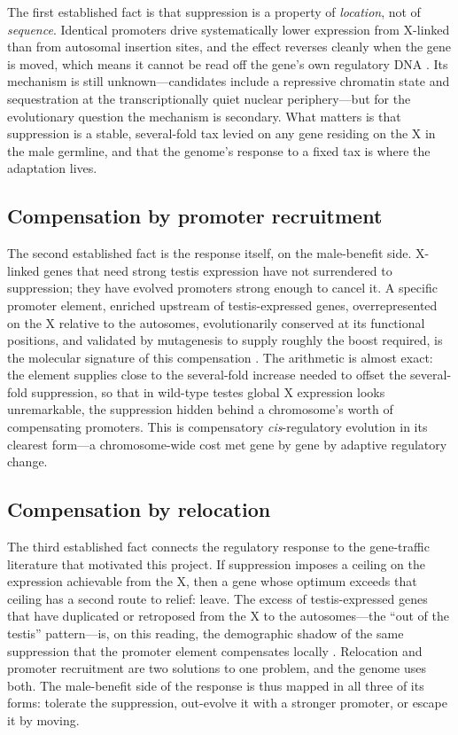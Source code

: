 \documentclass[11pt,a4paper]{article}
\begin{document}
The first established fact is that suppression is a property of \emph{location}, not of \emph{sequence}. Identical promoters drive systematically lower expression from X-linked than from autosomal insertion sites, and the effect reverses cleanly when the gene is moved, which means it cannot be read off the gene's own regulatory DNA \citep{landeen2016}. Its mechanism is still unknown---candidates include a repressive chromatin state and sequestration at the transcriptionally quiet nuclear periphery---but for the evolutionary question the mechanism is secondary. What matters is that suppression is a stable, several-fold tax levied on any gene residing on the X in the male germline, and that the genome's response to a fixed tax is where the adaptation lives.

\subsection{Compensation by promoter recruitment}

The second established fact is the response itself, on the male-benefit side. X-linked genes that need strong testis expression have not surrendered to suppression; they have evolved promoters strong enough to cancel it. A specific promoter element, enriched upstream of testis-expressed genes, overrepresented on the X relative to the autosomes, evolutionarily conserved at its functional positions, and validated by mutagenesis to supply roughly the boost required, is the molecular signature of this compensation \citep{landeen2016}. The arithmetic is almost exact: the element supplies close to the several-fold increase needed to offset the several-fold suppression, so that in wild-type testes global X expression looks unremarkable, the suppression hidden behind a chromosome's worth of compensating promoters. This is compensatory \emph{cis}-regulatory evolution in its clearest form---a chromosome-wide cost met gene by gene by adaptive regulatory change.

\subsection{Compensation by relocation}

The third established fact connects the regulatory response to the gene-traffic literature that motivated this project. If suppression imposes a ceiling on the expression achievable from the X, then a gene whose optimum exceeds that ceiling has a second route to relief: leave. The excess of testis-expressed genes that have duplicated or retroposed from the X to the autosomes---the ``out of the testis'' pattern---is, on this reading, the demographic shadow of the same suppression that the promoter element compensates locally \citep{betran2002,assis2019,zhang2010}. Relocation and promoter recruitment are two solutions to one problem, and the genome uses both. The male-benefit side of the response is thus mapped in all three of its forms: tolerate the suppression, out-evolve it with a stronger promoter, or escape it by moving.
\end{document}
